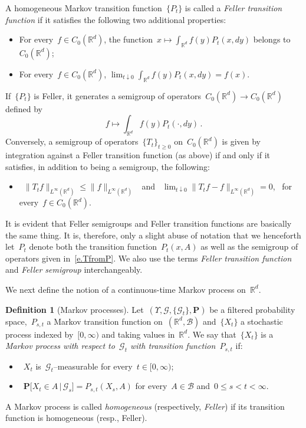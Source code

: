\documentclass[11pt,twoside]{article} %
\numberwithin{equation}{section}
\theoremstyle{definition}
\newtheorem{definition}[theorem]{Definition}
\newcommand*{\Rd}{\ensuremath{\mathbb{R}^d}}
\begin{document}
A homogeneous Markov transition function~$\{ P_t \}$ is called a \emph{Feller transition function} if it satisfies the following two additional properties: 
\begin{itemize}
\item For every~$f \in C_0(\Rd)$, 
the function~$\displaystyle x\mapsto \int_{\Rd} f(y) P_t (x,dy)$ belongs to~$C_0(\Rd)$;
\item For every~$f\in C_0(\Rd)$, 
$\displaystyle\lim_{t \downarrow 0} 
\int_{\Rd} f(y) P_t (x,dy) = f(x)
$. 
\end{itemize}
If~$\{ P_t\}$ is Feller, it generates a semigroup of operators~$C_0(\Rd) \to C_0(\Rd)$ defined by
\begin{equation}
\label{e.TfromP}
f \mapsto \int_{\Rd}f(y) P_{t}(\cdot,dy)  
\,.
\end{equation}
Conversely, a semigroup of operators~$\{ T_t \}_{t\geq 0}$ on~$C_0(\Rd)$ is given by integration against a Feller transition function (as above) if and only if it satisfies, in addition to being a semigroup, the following:
\begin{itemize}

\item~$\| T_t f \|_{L^\infty(\Rd)} \leq \| f \|_{L^\infty(\Rd)}$ \
and \
$\displaystyle\lim_{t \downarrow 0} \| T_t f -f \|_{L^\infty(\Rd)} = 0$, \ for every~$f\in C_0(\Rd)$. 

\end{itemize}
It is evident that Feller semigroups and Feller transition functions are basically the same thing. It is, therefore, only a slight abuse of notation that we henceforth let~$P_t$ denote both the transition function~$P_t(x,A)$ as well as the semigroup of operators given in~\eqref{e.TfromP}. We also use the terms \emph{Feller transition function} and \emph{Feller semigroup} interchangeably. 

\smallskip

We next define the notion of a continuous-time Markov process on~$\Rd$. 
\begin{definition}[Markov processes]
Let~$(\Upsilon, \mathcal{G}, \{ \mathcal{G}_t \},\mathbf{P})$ be a filtered probability space,~$P_{s,t}$ a Markov transition function on~$(\Rd,\mathscr{B})$ and~$\{ X_t \}$ a stochastic process indexed by~$[0,\infty)$ and taking values in~$\Rd$. 
We say that~$\{ X_t \}$ is a \emph{Markov process with respect to~$\mathcal{G}_t$ with transition function~$P_{s,t}$} if:
\begin{itemize}
\item~$X_t$ is~$\mathcal{G}_t$--measurable for every~$t\in [0,\infty)$;
\item~$\displaystyle\mathbf{P} \bigl[ X_t \in A \, | \, \mathcal{G}_s \bigr] = P_{s,t}(X_s,A)$
for every~$A \in \mathscr{B}$ and~$0\leq s < t < \infty$.
\end{itemize}
A Markov process is called \emph{homogeneous} (respectively, \emph{Feller}) if its transition function is homogeneous (resp., Feller). 
\end{definition}
\end{document}
